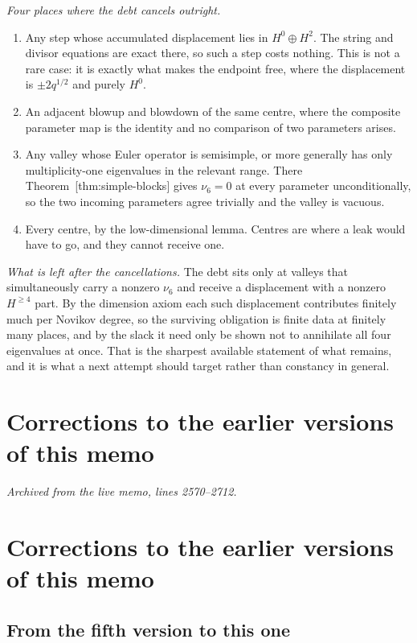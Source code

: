 \documentclass[11pt]{article}
\theoremstyle{definition}
\theoremstyle{remark}
\begin{document}
\emph{Four places where the debt cancels outright.}
\begin{enumerate}
\item Any step whose accumulated displacement lies in $H^0\oplus H^2$. The string
  and divisor equations are exact there, so such a step costs nothing. This is
  not a rare case: it is exactly what makes the endpoint free, where the
  displacement is $\pm2q^{1/2}$ and purely $H^0$.
\item An adjacent blowup and blowdown of the same centre, where the composite
  parameter map is the identity and no comparison of two parameters arises.
\item Any valley whose Euler operator is semisimple, or more generally has only
  multiplicity-one eigenvalues in the relevant range. There
  Theorem~\textup{[thm:simple-blocks]} gives $\nu_6=0$ at every parameter
  unconditionally, so the two incoming parameters agree trivially and the valley
  is vacuous.
\item Every centre, by the low-dimensional lemma. Centres are where a leak would
  have to go, and they cannot receive one.
\end{enumerate}

\emph{What is left after the cancellations.} The debt sits only at valleys that
simultaneously carry a nonzero $\nu_6$ and receive a displacement with a nonzero
$H^{\ge4}$ part. By the dimension axiom each such displacement contributes
finitely much per Novikov degree, so the surviving obligation is finite data at
finitely many places, and by the slack it need only be shown not to annihilate
all four eigenvalues at once. That is the sharpest available statement of what
remains, and it is what a next attempt should target rather than constancy in
general.


\section{Corrections to the earlier versions of this memo}
\noindent\emph{Archived from the live memo, lines 2570--2712.}

\section{Corrections to the earlier versions of this memo}


\subsection*{From the fifth version to this one}
\end{document}
